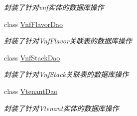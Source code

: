 \begin{DoxyCompactItemize}
\begin{DoxyCompactList}\small\item\em 封装了针对vnf实体的数据库操作 \end{DoxyCompactList}\item 
class \mbox{\hyperlink{interfacecom_1_1example_1_1demo_1_1dao_1_1_vnf_flavor_dao}{Vnf\+Flavor\+Dao}}
\begin{DoxyCompactList}\small\item\em 封装了针对\+Vnf\+Flavor关联表的数据库操作 \end{DoxyCompactList}\item 
class \mbox{\hyperlink{interfacecom_1_1example_1_1demo_1_1dao_1_1_vnf_stack_dao}{Vnf\+Stack\+Dao}}
\begin{DoxyCompactList}\small\item\em 封装了针对\+Vnf\+Stack关联表的数据库操作 \end{DoxyCompactList}\item 
class \mbox{\hyperlink{interfacecom_1_1example_1_1demo_1_1dao_1_1_vtenant_dao}{Vtenant\+Dao}}
\begin{DoxyCompactList}\small\item\em 封装了针对\+Vtenant实体的数据库操作 \end{DoxyCompactList}\end{DoxyCompactItemize}
